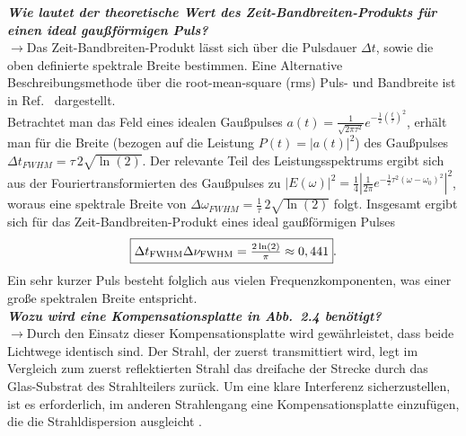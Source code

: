\textbf{\textit{Wie lautet der theoretische Wert des Zeit-Bandbreiten-Produkts für
einen ideal gaußförmigen Puls?}}\\
$\rightarrow$Das Zeit-Bandbreiten-Produkt lässt sich über die Pulsdauer $\Delta t$, sowie die 
oben definierte spektrale Breite bestimmen. 
Eine Alternative Beschreibungsmethode über die root-mean-square (rms) Puls- und Bandbreite 
ist in Ref.~\cite{UltraFast} dargestellt. \\
Betrachtet man das Feld eines idealen Gaußpulses 
$a(t)=\frac{1}{\sqrt{2\pi \tau^{2}}}e^{-\frac{1}{2}(\frac{t}{\tau})^{2}}$, erhält man für die 
Breite (bezogen auf die Leistung $P(t)=|a(t)|^{2}$) des Gaußpulses $\Delta t_{FWHM} = \tau\,2\sqrt{\ln(2)}$. 
Der relevante Teil des Leistungsspektrums ergibt sich aus der Fouriertransformierten des Gaußpulses zu 
$|E(\omega)|^{2} = \frac{1}{4}\left\vert\frac{1}{2\pi}e^{-\frac{1}{2}\tau^{2}(\omega-\omega_{0})^{2}}\right\vert^{2}$, woraus 
eine spektrale Breite von $\Delta \omega_{FWHM} = \frac{1}{\tau}\,2\sqrt{\ln(2)}$ folgt.
Insgesamt ergibt sich für das Zeit-Bandbreiten-Produkt eines ideal gaußförmigen Pulses
\begin{equation}
    \fbox{$\Delta t_{\text{FWHM}}\Delta \nu_{\text{FWHM}} = \frac{2\ln(2)}{\pi} \approx 0,441$}.
\end{equation}
Ein sehr kurzer Puls besteht folglich aus vielen Frequenzkomponenten, was einer große spektralen 
Breite entspricht. \\

\textbf{\textit{Wozu wird eine Kompensationsplatte in Abb.~2.4 benötigt?}}\\
$\rightarrow$Durch den Einsatz dieser Kompensationsplatte wird gewährleistet, dass beide Lichtwege 
identisch sind. Der Strahl, der zuerst transmittiert wird, legt im Vergleich zum zuerst 
reflektierten Strahl das dreifache der Strecke durch das Glas-Substrat des Strahlteilers zurück. 
Um eine klare Interferenz sicherzustellen, ist es erforderlich, im anderen Strahlengang eine 
Kompensationsplatte einzufügen, die die Strahldispersion ausgleicht \cite{OpticsHand}.

